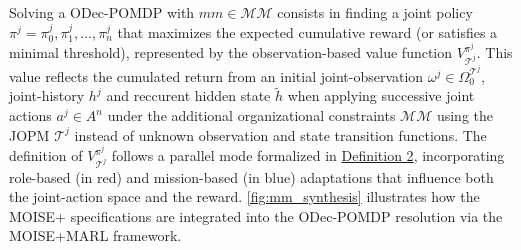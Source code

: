 Solving a ODec-POMDP with $mm \in \mathcal{MM}$ consists in finding a joint policy $\pi^j = {\pi^j_0, \pi^j_1, \dots, \pi^j_n}$ that maximizes the expected cumulative reward (or satisfies a minimal threshold), represented by the observation-based value function $V_{\mathcal{T}^j}^{\pi^j}$. This value reflects the cumulated return from an initial joint-observation $\omega^j \in \Omega^{\mathcal{T}^j}_0$, joint-history $h^j$ and reccurent hidden state $\tilde{h}$ when applying successive joint actions $a^j \in A^n$ under the additional organizational constraints $\mathcal{MM}$ using the JOPM $\mathcal{T}^j$ instead of unknown observation and state transition functions.
%
The definition of $V_{\mathcal{T}^j}^{\pi^j}$ follows a parallel mode formalized in \hyperref[eq:single_value_function]{Definition 2}, incorporating role-based (in red) and mission-based (in blue) adaptations that influence both the joint-action space and the reward.
\autoref{fig:mm_synthesis} illustrates how the MOISE+ specifications are integrated into the ODec-POMDP resolution via the MOISE+MARL framework.

